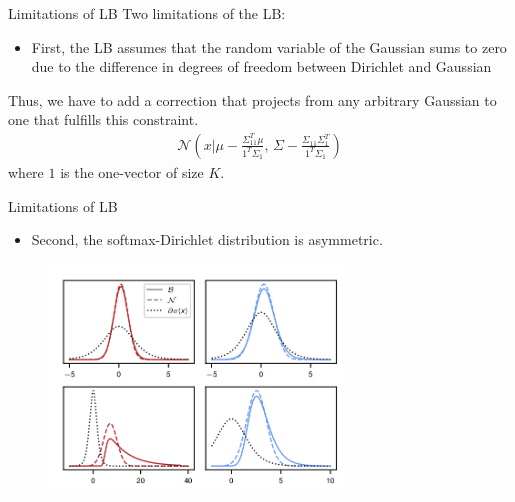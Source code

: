 \documentclass{beamer}
\begin{document}

\begin{frame}{Limitations of LB}
 Two limitations of the LB: 
 \begin{itemize}
     \item First, the LB assumes that the random variable of the Gaussian sums to zero due to the difference in degrees of freedom between Dirichlet and Gaussian
 \end{itemize}  
 Thus, we have to add a correction that projects from any
arbitrary Gaussian to one that fulfills this constraint.
\begin{gather*}
    \mathcal{N} \left( x \big| \mu - \frac{\Sigma_{11}^T \mu}{1^T \Sigma_1}, \, \Sigma - \frac{\Sigma_{11} \Sigma_{1}^T}{1^T \Sigma_1} \right)
\end{gather*}
where \( 1 \) is the one-vector of size \( K \).
\end{frame}


\begin{frame}{Limitations of LB}
\footnotesize
 \begin{itemize}
     \item Second, the softmax-Dirichlet distribution is asymmetric.
 \end{itemize}  
 \begin{figure}
        \centering
        \includegraphics[width=0.7\textwidth]{figs/assymetric.png} %
    \end{figure}

\end{frame}

\end{document}
